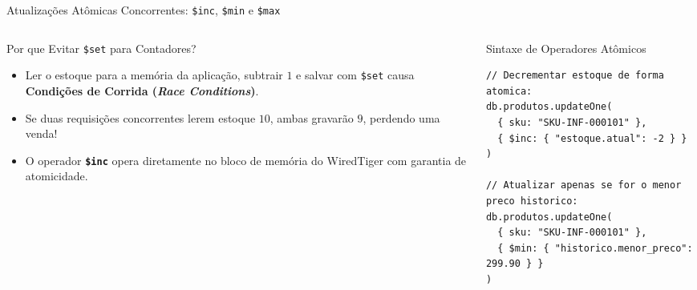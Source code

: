 \begin{frame}[fragile]{Atualizações Atômicas Concorrentes: \texttt{\$inc}, \texttt{\$min} e \texttt{\$max}}
  \vspace{0.05cm}
  \begin{columns}[t]
    \begin{column}{0.48\textwidth}
      \alert{Por que Evitar \texttt{\$set} para Contadores?}\par
      \scriptsize
      \begin{itemize}
        \item Ler o estoque para a memória da aplicação, subtrair $1$ e salvar com \texttt{\$set} causa \textbf{Condições de Corrida (\textit{Race Conditions})}.
        \item Se duas requisições concorrentes lerem estoque $10$, ambas gravarão $9$, perdendo uma venda!
        \item O operador \textbf{\texttt{\$inc}} opera diretamente no bloco de memória do WiredTiger com garantia de atomicidade.
      \end{itemize}
    \end{column}
    \begin{column}{0.48\textwidth}
      \alert{Sintaxe de Operadores Atômicos}\par
      \begin{lstlisting}[language=mongosh]
// Decrementar estoque de forma atomica:
db.produtos.updateOne(
  { sku: "SKU-INF-000101" },
  { $inc: { "estoque.atual": -2 } }
)

// Atualizar apenas se for o menor preco historico:
db.produtos.updateOne(
  { sku: "SKU-INF-000101" },
  { $min: { "historico.menor_preco": 299.90 } }
)
      \end{lstlisting}
    \end{column}
  \end{columns}
\end{frame}

